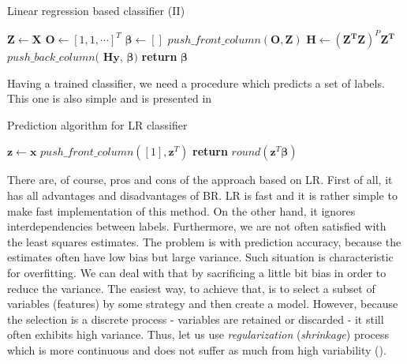 \begin{algorithm}
    \caption{Linear regression based classifier (II)}\label{alg:LR1}
    \begin{algorithmic}[1]
        \State $\boldsymbol{Z} \gets \boldsymbol{X}$ 
        \State $\boldsymbol{O} \gets [1, 1, \cdots]^T$ 
        \State $\boldsymbol{\beta} \gets []$
        \State $push\_front\_column(\boldsymbol{O}, \boldsymbol{Z})$
        \State $\boldsymbol{H} \gets (\boldsymbol{Z^T}\boldsymbol{Z})^P\boldsymbol{Z^T}$
            \State $push\_back\_column($ $\boldsymbol{H}\boldsymbol{y}$, $\boldsymbol{\beta})$ 
        \EndFor
        \State \textbf{return} $\boldsymbol{\beta}$
    \EndFunction
    \end{algorithmic}
\end{algorithm}


Having a trained classifier, we need a procedure which predicts a set of labels. This one is also simple and is presented in 

\begin{algorithm}
    \caption{Prediction algorithm for LR classifier}\label{alg:CL1}
    \begin{algorithmic}[1]
        \State $\boldsymbol{z} \gets \boldsymbol{x}$ 
        \State $push\_front\_column([1], \boldsymbol{z}^T)$ 
        \State \textbf{return} $round(\boldsymbol{z}^T\boldsymbol{\beta})$
    \EndFunction
    \end{algorithmic}
\end{algorithm}

There are, of course, pros and cons of the approach based on LR. First of all, it has all advantages and disadvantages of BR. LR is fast and it is rather simple to make fast implementation of this method. On the other hand, it ignores interdependencies between labels. Furthermore, we are not often satisfied with the least squares estimates. The problem is with prediction accuracy, because the estimates often have low bias but large variance. Such situation is characteristic for overfitting. We can deal with that by sacrificing a little bit bias in order to reduce the variance. The easiest way, to achieve that, is to select a subset of variables (features) by some strategy and then create a model. However, because the selection is a discrete process - variables are retained or discarded - it still often exhibits high variance. Thus, let us use \textit{regularization} (\textit{shrinkage}) process which is more continuous and does not suffer as much from high variability (\cite{Trevor}).

